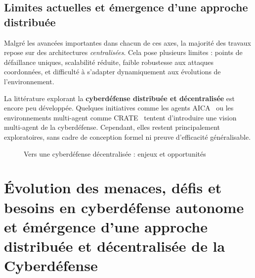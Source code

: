 \documentclass[ twoside,openright,titlepage,numbers=noenddot,headinclude,%
                footinclude=true,cleardoublepage=empty,abstractoff, %
                BCOR=5mm,paper=a4,fontsize=11pt,%
                french,american,%
                ]{scrreprt}
\begin{document}
\subsection*{Limites actuelles et émergence d'une approche distribuée}

Malgré les avancées importantes dans chacun de ces axes, la majorité des travaux repose sur des architectures \textit{centralisées}. Cela pose plusieurs limites : points de défaillance uniques, scalabilité réduite, faible robustesse aux attaques coordonnées, et difficulté à s'adapter dynamiquement aux évolutions de l'environnement.

La littérature explorant la \textbf{cyberdéfense distribuée et décentralisée} est encore peu développée. Quelques initiatives comme les agents AICA~\cite{AICAReport2021} ou les environnements multi-agent comme CRATE~\cite{CRATE2021} tentent d'introduire une vision multi-agent de la cyberdéfense. Cependant, elles restent principalement exploratoires, sans cadre de conception formel ni preuve d'efficacité généralisable.

\begin{figure}[h]
    \centering
    \caption{Vers une cyberdéfense décentralisée : enjeux et opportunités}
    \label{fig:distributed_cyberdefense}
\end{figure}


\section{Évolution des menaces, défis et besoins en cyberdéfense autonome et émérgence d'une approche distribuée et décentralisée de la Cyberdéfense}\label{sec:evolution-menaces}

\end{document}
